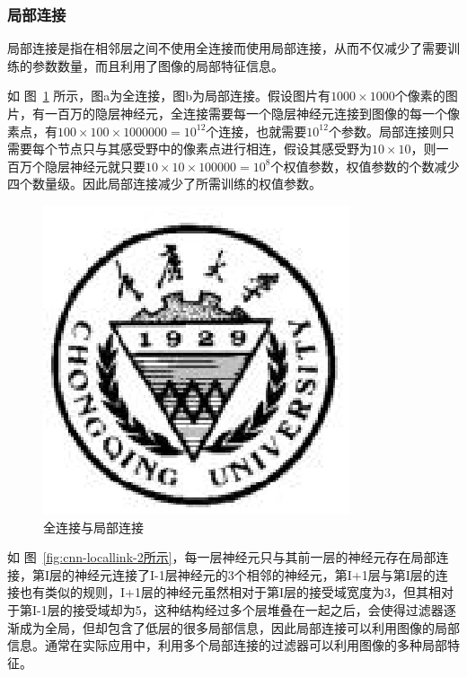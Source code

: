 \documentclass[bachelor,zhspacing]{cqu}  %
\begin{document}
\subsubsection{局部连接}\label{ux5c40ux90e8ux8fdeux63a5}

局部连接是指在相邻层之间不使用全连接而使用局部连接，从而不仅减少了需要训练的参数数量，而且利用了图像的局部特征信息。

如 图~\ref{fig:cnn-locallink-1}
所示，图a为全连接，图b为局部连接。假设图片有\(1000\times1000\)个像素的图片，有一百万的隐层神经元，全连接需要每一个隐层神经元连接到图像的每一个像素点，有\(100\times 100\times 1000000 = 10^{12}\)个连接，也就需要\(10^{12}\)个参数。局部连接则只需要每个节点只与其感受野中的像素点进行相连，假设其感受野为\(10\times 10\)，则一百万个隐层神经元就只要\(10\times 10\times 100000 = 10^{8}\)个权值参数，权值参数的个数减少四个数量级。因此局部连接减少了所需训练的权值参数。

\begin{figure}[htbp]
\centering
\includegraphics{./pic/cqu.eps}
\caption{全连接与局部连接}\label{fig:cnn-locallink-1}
\end{figure}

如
图~\ref{fig:cnn-locallink-2所示}，每一层神经元只与其前一层的神经元存在局部连接，第I层的神经元连接了I-1层神经元的3个相邻的神经元，第I+1层与第I层的连接也有类似的规则，I+1层的神经元虽然相对于第I层的接受域宽度为3，但其相对于第I-1层的接受域却为5，这种结构经过多个层堆叠在一起之后，会使得过滤器逐渐成为全局，但却包含了低层的很多局部信息，因此局部连接可以利用图像的局部信息。通常在实际应用中，利用多个局部连接的过滤器可以利用图像的多种局部特征。
\end{document}
